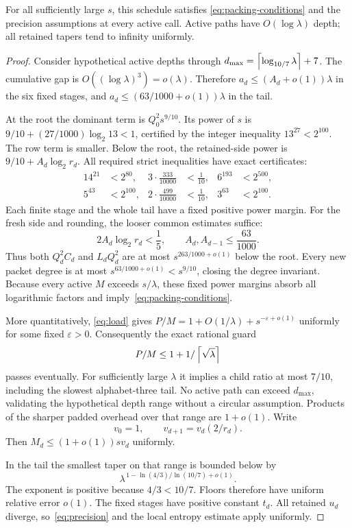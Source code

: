 \begin{lemma}\label{lem:poly-feasible}
For all sufficiently large $s$, this schedule satisfies
\eqref{eq:packing-conditions} and the precision assumptions at every active
call. Active paths have $O(\log\lambda)$ depth; all retained tapers tend to
infinity uniformly.
\end{lemma}
\begin{proof}
Consider hypothetical active depths through
$d_{\max}=\left\lceil\log_{10/7}\lambda\right\rceil+7$. The cumulative gap is
$O((\log\lambda)^3)=o(\lambda)$. Therefore
$a_d\le(A_d+o(1))\lambda$ in the six fixed stages, and
$a_d\le(63/1000+o(1))\lambda$ in the tail.

At the root the dominant term is $Q_0^2s^{9/10}$. Its power of $s$ is
$9/10+(27/1000)\log_2 13<1$, certified by the integer inequality
$13^{27}<2^{100}$. The row term is smaller. Below the root, the retained-side
power is $9/10+A_d\log_2r_d$. All required strict inequalities have exact
certificates:
\begin{align*}
 14^{21}&<2^{80},& 3\cdot\frac{333}{10000}&<\frac1{10},&
 6^{193}&<2^{500},\\
 5^{43}&<2^{100},&2\cdot\frac{499}{10000}&<\frac1{10},&
 3^{63}&<2^{100}.
\end{align*}
Each finite stage and the whole tail have a fixed positive power margin.
For the fresh side and rounding, the looser common estimates suffice:
\[
 2A_d\log_2r_d<\frac15,\qquad A_d,A_{d-1}\le\frac{63}{1000}.
\]
Thus both $Q_d^2C_d$ and $L_dQ_d^2$ are at most
$s^{263/1000+o(1)}$ below the root. Every new packet degree is at most
$s^{63/1000+o(1)}<s^{9/10}$, closing the degree invariant. Because every
active $M$ exceeds $s/\lambda$, these fixed power margins absorb all
logarithmic factors and imply~\eqref{eq:packing-conditions}.

More quantitatively, \eqref{eq:load} gives
$P/M=1+O(1/\lambda)+s^{-\varepsilon+o(1)}$ uniformly for some fixed
$\varepsilon>0$. Consequently the exact rational guard
\[
 P/M\le1+1/\left\lceil\sqrt\lambda\right\rceil
\]
passes eventually. For sufficiently large $\lambda$ it implies a child ratio
at most $7/10$, including the slowest alphabet-three tail. No active path
can exceed $d_{\max}$, validating the hypothetical depth range without a
circular assumption. Products of the sharper padded overhead over that range
are $1+o(1)$. Write
\begin{equation}\label{eq:mass-profile}
 v_0=1,\qquad v_{d+1}=v_d(2/r_d).
\end{equation}
Then $M_d\le(1+o(1))sv_d$ uniformly.

In the tail the smallest taper on that range is bounded below by
\[
 \lambda^{\,1-\ln(4/3)/\ln(10/7)+o(1)}.
\]
The exponent is positive because $4/3<10/7$. Floors therefore have uniform
relative error $o(1)$. The fixed stages have positive constant $t_d$.
All retained $u_d$ diverge, so~\eqref{eq:precision} and the local entropy
estimate apply uniformly.
\end{proof}

